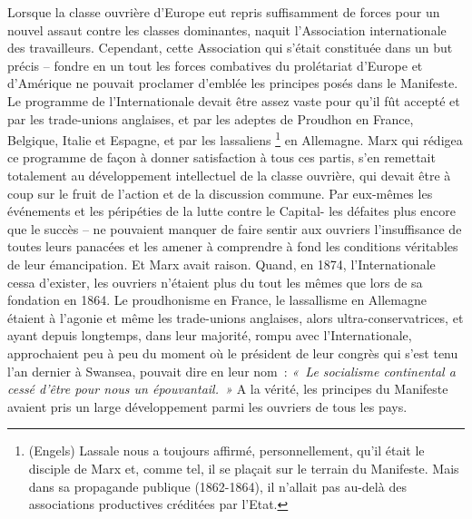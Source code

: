 \documentclass[french,twoside]{book} %
\begin{document}
Lorsque la classe ouvrière d’Europe eut repris suffisamment de forces pour un nouvel assaut contre les classes dominantes, naquit l’Association internationale des travailleurs. Cependant, cette Association qui s’était constituée dans un but précis – fondre en un tout les forces combatives du prolétariat d’Europe et d’Amérique ne pouvait proclamer d’emblée les principes posés dans le Manifeste. Le programme de l’Internationale devait être assez vaste pour qu’il fût accepté et par les trade-unions anglaises, et par les adeptes de Proudhon en France, Belgique, Italie et Espagne, et par les lassaliens \footnote{(Engels) Lassale nous a toujours affirmé, personnellement, qu’il était le disciple de Marx et, comme tel, il se plaçait sur le terrain du Manifeste. Mais dans sa propagande publique (1862-1864), il n’allait pas au-delà des associations productives créditées par l’Etat.} en Allemagne. Marx qui rédigea ce programme de façon à donner satisfaction à tous ces partis, s’en remettait totalement au développement intellectuel de la classe ouvrière, qui devait être à coup sur le fruit de l’action et de la discussion commune. Par eux-mêmes les événements et les péripéties de la lutte contre le Capital- les défaites plus encore que le succès – ne pouvaient manquer de faire sentir aux ouvriers l’insuffisance de toutes leurs panacées et les amener à comprendre à fond les conditions véritables de leur émancipation. Et Marx avait raison. Quand, en 1874, l’Internationale cessa d’exister, les ouvriers n’étaient plus du tout les mêmes que lors de sa fondation en 1864. Le proudhonisme en France, le lassallisme en Allemagne étaient à l’agonie et même les trade-unions anglaises, alors ultra-conservatrices, et ayant depuis longtemps, dans leur majorité, rompu avec l’Internationale, approchaient peu à peu du moment où le président de leur congrès qui s’est tenu l’an dernier à Swansea, pouvait dire en leur nom : \emph{« Le socialisme continental a cessé d’être pour nous un épouvantail. »} A la vérité, les principes du Manifeste avaient pris un large développement parmi les ouvriers de tous les pays.\par
\end{document}
